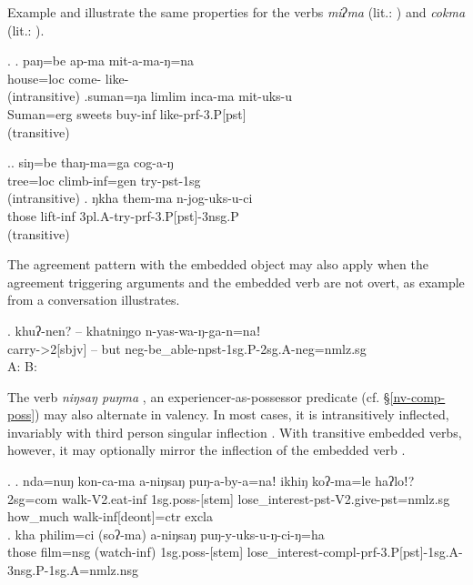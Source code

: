 
Example \Next  and \NNext illustrate  the same properties for  the verbs \emph{miʔma}  (lit.: ) and  \emph{cokma}  (lit.: ). 

\ex. \ag.   paŋ=be     ap-ma            mit-a-ma-ŋ=na\\  
	house{\sc =loc} come- like-\\
	 (intransitive) 
\bg.suman=ŋa    limlim inca-ma    mit-uks-u\\
Suman{\sc =erg} sweets  buy{\sc -inf}  like{\sc [3sg.A]-prf-3.P[pst]}\\
	 (transitive) 

\ex.\ag.  siŋ=be    thaŋ-ma=ga       cog-a-ŋ\\
tree{\sc =loc} climb{\sc -inf=gen} try{\sc -pst-1sg}\\
  (intransitive) 
\bg. ŋkha them-ma     n-jog-uks-u-ci\\
those lift{\sc -inf} {\sc 3pl.A-}try{\sc -prf-3.P[pst]-3nsg.P}\\
  (transitive) 


The agreement pattern with the embedded object may also apply when the agreement triggering arguments and the embedded verb are not overt, as example \Next from a conversation illustrates.

\exg. khuʔ-nen? – khatniŋgo n-yas-wa-ŋ-ga-n=naǃ\\
carry-{>2[sbjv]}  – but {\sc neg}-be\_able-{\sc npst-1sg.P-2sg.A-neg=nmlz.sg}\\
A:  B: 


The  verb \emph{niŋsaŋ puŋma} , an experiencer-as-possessor predicate (cf. §\ref{nv-comp-poss}) may also alternate in valency. In most cases, it is intransitively inflected, invariably with third person singular inflection \Next[a]. With transitive embedded verbs, however, it may optionally mirror the inflection of the embedded verb  \Next[b]. 

\ex. \ag. nda=nuŋ kon-ca-ma a-niŋsaŋ puŋ-a-by-a=naǃ ikhiŋ koʔ-ma=le haʔloǃ? \\
	{\sc 2sg=com} walk{\sc -V2.eat-inf} {\sc 1sg.poss-[stem]}  lose\_interest{\sc [3sg]-pst-V2.give-pst=nmlz.sg} how\_much walk{\sc -inf[deont]=ctr}  {\sc excla}\\
	\bg. kha philim=ci (soʔ-ma) a-niŋsaŋ puŋ-y-uks-u-ŋ-ci-ŋ=ha\\
		{\sc those} film{\sc =nsg} (watch{\sc -inf}) {\sc 1sg.poss-[stem]} lose\_interest{\sc -compl-prf-3.P[pst]-1sg.A-3nsg.P-1sg.A=nmlz.nsg}	\\
 


